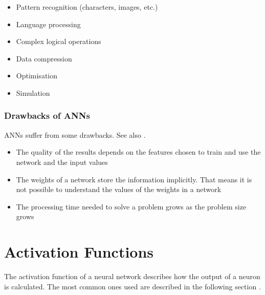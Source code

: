 \begin{itemize}
    \item Pattern recognition (characters, images, etc.)
	\item Language processing
	\item Complex logical operations
	\item Data compression
	\item Optimisation
	\item Simulation
\end{itemize}

\subsubsection{Drawbacks of ANNs}

ANNs suffer from some drawbacks. See also \cite{nn_limitations}.

\begin{itemize}
    \item The quality of the results depends on the features chosen to train and use the network and the input values
	\item The weights of a network store the information implicitly. That means it is not possible to understand the values of the weights in a network
	\item The processing time needed to solve a problem grows as the problem size grows
\end{itemize}

\section{Activation Functions}
\label{sec:activation}

The activation function of a neural network describes how the output of a neuron is calculated. The most common ones used are described in the following section \cite{nn_actfct}.

